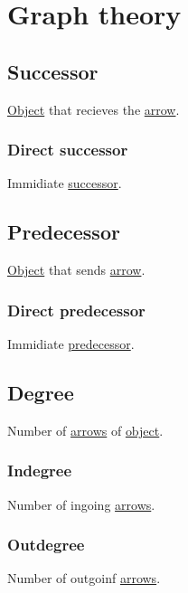 \documentclass[a4paper,14pt,oneside]{book}
\begin{document}
\chapter{\label{org9a3f033}Graph theory}
\label{sec:org29bdca2}
\section{\label{org49e3499}Successor}
\label{sec:org704cc52}
\hyperref[orgef6fa9d]{Object} that recieves the \hyperref[orgc93956a]{arrow}.\\

\subsection{\label{org01a56b1}Direct successor}
\label{sec:orgb9093db}
Immidiate \hyperref[org49e3499]{successor}.\\

\section{\label{org342fd49}Predecessor}
\label{sec:orge2db86a}
\hyperref[orgef6fa9d]{Object} that sends \hyperref[orgc93956a]{arrow}.\\

\subsection{\label{org98e3672}Direct predecessor}
\label{sec:orgd68784b}
Immidiate \hyperref[org342fd49]{predecessor}.\\


\section{\label{orgffe2b49}Degree}
\label{sec:org8ba5cb4}
Number of \hyperref[orge3fa7c8]{arrows} of \hyperref[orgef6fa9d]{object}.\\

\subsection{\label{orga8e39df}Indegree}
\label{sec:org6033324}
Number of ingoing \hyperref[orge3fa7c8]{arrows}.\\

\subsection{\label{org3a22a82}Outdegree}
\label{sec:org129f113}
Number of outgoinf \hyperref[orge3fa7c8]{arrows}.\\
\end{document}
